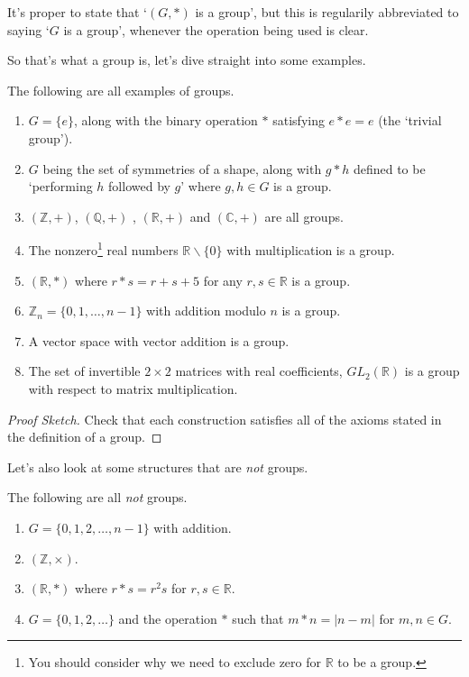 \documentclass[a4]{scrartcl}
\begin{document}
\begin{notation}
	It's proper to state that `$(G, *)$ is a group', but this is regularily abbreviated to saying `$G$ is a group', whenever the operation being used is clear.
\end{notation}

So that's what a group is, let's dive straight into some examples.

\begin{example}
	The following are all examples of groups.
	\begin{enumerate}
		\item $G = \{e\}$, along with the binary operation $*$ satisfying $e * e = e$ (the `trivial group').
		\item $G$ being the set of symmetries of a shape, along with $g*h$ defined to be `performing $h$ followed by $g$' where $g, h \in G$ is a group.
		\item $(\mathbb{Z}, +)$, $(\mathbb{Q}, +)$ , $(\mathbb{R}, +)$  and $(\mathbb{C}, +)$ are all groups.
		\item The nonzero\footnote{You should consider why we need to exclude zero for $\mathbb{R}$ to be a group.} real numbers $\mathbb{R}\backslash \{0\}$ with multiplication is a group.
		\item $(\mathbb{R}, *)$ where $r * s = r + s + 5$ for any $r, s \in \mathbb{R}$ is a group.
		\item $\mathbb{Z}_n = \{0, 1, \dots, n - 1\}$ with addition modulo $n$ is a group.
		\item A vector space with vector addition is a group.
		\item The set of invertible $2 \times 2$ matrices with real coefficients, $GL_2(\mathbb{R})$ is a group with respect to matrix multiplication.
	\end{enumerate}
\end{example}
\begin{proof}[Proof Sketch]
	Check that each construction satisfies all of the axioms stated in the definition of a group.
\end{proof}

Let's also look at some structures that are \emph{not} groups.

\begin{example}
	The following are all \emph{not} groups.
	\begin{enumerate}
		\item $G = \{0, 1, 2, \dots, n - 1\}$ with addition.
		\item $(\mathbb{Z}, \times)$.
		\item $(\mathbb{R}, *)$ where $r * s = r^2 s$ for $r, s \in \mathbb{R}$.
		\item $G = \{0, 1, 2, \dots\}$ and the operation $*$ such that $m * n = |n - m|$ for $m, n \in G$.
	\end{enumerate}
\end{example}
\end{document}
